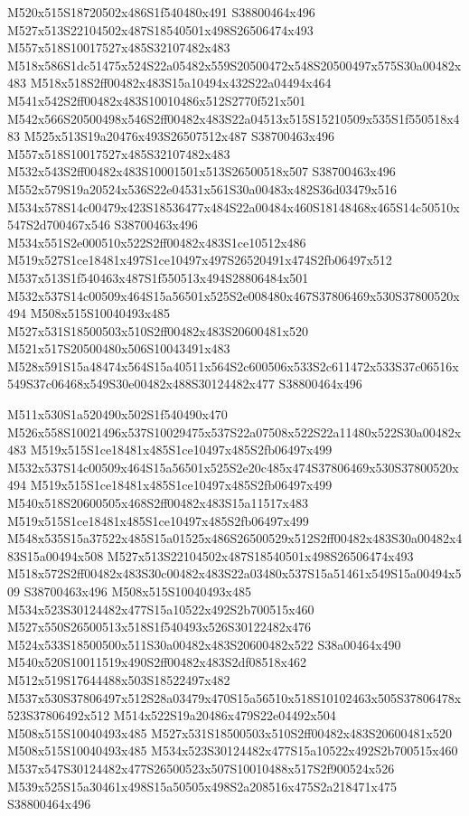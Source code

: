 \documentclass{article}
\begin{document}
\begin{multicols}{2}
M520x515S18720502x486S1f540480x491 S38800464x496 M527x513S22104502x487S18540501x498S26506474x493 M557x518S10017527x485S32107482x483 M518x586S1dc51475x524S22a05482x559S20500472x548S20500497x575S30a00482x483 M518x518S2ff00482x483S15a10494x432S22a04494x464 M541x542S2ff00482x483S10010486x512S2770f521x501 M542x566S20500498x546S2ff00482x483S22a04513x515S15210509x535S1f550518x483 M525x513S19a20476x493S26507512x487 S38700463x496 M557x518S10017527x485S32107482x483 M532x543S2ff00482x483S10001501x513S26500518x507 S38700463x496 M552x579S19a20524x536S22e04531x561S30a00483x482S36d03479x516 M534x578S14c00479x423S18536477x484S22a00484x460S18148468x465S14c50510x547S2d700467x546 S38700463x496 M534x551S2e000510x522S2ff00482x483S1ce10512x486 M519x527S1ce18481x497S1ce10497x497S26520491x474S2fb06497x512 M537x513S1f540463x487S1f550513x494S28806484x501 M532x537S14c00509x464S15a56501x525S2e008480x467S37806469x530S37800520x494 M508x515S10040493x485 M527x531S18500503x510S2ff00482x483S20600481x520 M521x517S20500480x506S10043491x483 M528x591S15a48474x564S15a40511x564S2c600506x533S2c611472x533S37c06516x549S37c06468x549S30e00482x488S30124482x477 S38800464x496

M511x530S1a520490x502S1f540490x470 M526x558S10021496x537S10029475x537S22a07508x522S22a11480x522S30a00482x483 M519x515S1ce18481x485S1ce10497x485S2fb06497x499 M532x537S14c00509x464S15a56501x525S2e20c485x474S37806469x530S37800520x494 M519x515S1ce18481x485S1ce10497x485S2fb06497x499 M540x518S20600505x468S2ff00482x483S15a11517x483 M519x515S1ce18481x485S1ce10497x485S2fb06497x499 M548x535S15a37522x485S15a01525x486S26500529x512S2ff00482x483S30a00482x483S15a00494x508 M527x513S22104502x487S18540501x498S26506474x493 M518x572S2ff00482x483S30c00482x483S22a03480x537S15a51461x549S15a00494x509 S38700463x496 M508x515S10040493x485 M534x523S30124482x477S15a10522x492S2b700515x460 M527x550S26500513x518S1f540493x526S30122482x476 M524x533S18500500x511S30a00482x483S20600482x522 S38a00464x490 M540x520S10011519x490S2ff00482x483S2df08518x462 M512x519S17644488x503S18522497x482 M537x530S37806497x512S28a03479x470S15a56510x518S10102463x505S37806478x523S37806492x512 M514x522S19a20486x479S22e04492x504 M508x515S10040493x485 M527x531S18500503x510S2ff00482x483S20600481x520 M508x515S10040493x485 M534x523S30124482x477S15a10522x492S2b700515x460 M537x547S30124482x477S26500523x507S10010488x517S2f900524x526 M539x525S15a30461x498S15a50505x498S2a208516x475S2a218471x475 S38800464x496


\end{multicols}
\end{document}
